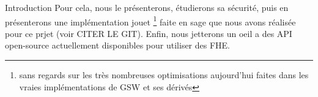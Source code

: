 \begin{section}{Introduction}
	Pour cela, nous le présenterons, étudierons sa sécurité, puis en
	présenterons une implémentation jouet \footnote{sans regards sur les
	très nombreuses optimisations aujourd'hui faites dans les vraies
	implémentations de GSW et ses dérivés} faite en sage que nous avons réalisée
	pour ce prjet (voir CITER LE GIT). Enfin, nous jetterons un oeil 
	a des API open-source  actuellement disponibles pour utiliser des FHE.
\end{section}
